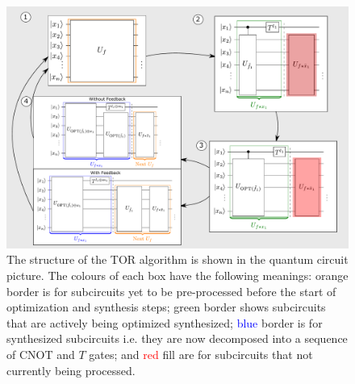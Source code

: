 \documentclass[notitlepage]{article}
\theoremstyle{definition}
\theoremstyle{problem}
\theoremstyle{lemma}
\begin{document}
\begin{figure}
	\centering	
	\includegraphics[width=0.7\linewidth]{TORfig3}
	\caption{The structure of the TOR algorithm is shown in the quantum circuit picture. The colours of each box have the following meanings: \textcolor{orange!80!black}{orange} border is for subcircuits yet to be pre-processed before the start of optimization and synthesis steps; \textcolor{green!50!black}{green} border shows subcircuits that are actively being optimized synthesized; \textcolor{blue}{blue} border is for synthesized subcircuits i.e. they are now decomposed into a sequence of CNOT and $T$ gates; and \textcolor{red}{red} fill are for subcircuits that not currently being processed.}
	\label{fig_TOR}
\end{figure}
\end{document}
